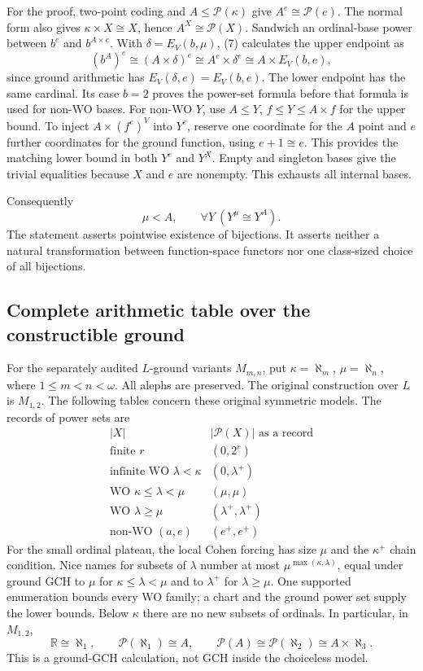 For the proof, two-point coding and $A\leq\mathcal P(\kappa)$ give
$A^e\cong\mathcal P(e)$. The normal form also gives
$\kappa\times X\cong X$, hence $A^X\cong\mathcal P(X)$.
Sandwich an ordinal-base power between $b^e$ and $b^{A\times e}$.
With $\delta=E_V(b,\mu)$, (7) calculates the upper endpoint as
\[
 (b^A)^e\cong(A\times\delta)^e
 \cong A^e\times\delta^e\cong A\times E_V(b,e),
\]
since ground arithmetic has $E_V(\delta,e)=E_V(b,e)$.
The lower endpoint has the same cardinal. Its case $b=2$ proves the
power-set formula before that formula is used for non-WO bases.
For non-WO $Y$, use $A\leq Y$, $f\leq Y\leq A\times f$ for the upper
bound. To inject $A\times(f^e)^V$ into $Y^e$, reserve one coordinate for
the $A$ point and $e$ further coordinates for the ground function,
using $e+1\cong e$. This provides the matching lower bound in both
$Y^e$ and $Y^X$. Empty and singleton bases give the trivial equalities
because $X$ and $e$ are nonempty. This exhausts all internal bases.

Consequently
\[
                  \mu<A,\qquad \forall Y\ (Y^\mu\cong Y^A).    \tag{10}
\]
The statement asserts pointwise existence of bijections. It asserts
neither a natural transformation between function-space functors nor
one class-sized choice of all bijections.

\subsection{Complete arithmetic table over the constructible ground}

For the separately audited $L$-ground variants $M_{m,n}$, put
$\kappa=\aleph_m$, $\mu=\aleph_n$, where $1\leq m<n<\omega$.
All alephs are preserved. The original construction over $L$ is $M_{1,2}$.
The following tables concern these original symmetric models.
The records of power sets are
\[
\begin{array}{c|c}
 |X|&|\mathcal P(X)|\text{ as a record}\\ \hline
 \text{finite }r&(0,2^r)\\
 \text{infinite WO }\lambda<\kappa&(0,\lambda^+)\\
 \text{WO }\kappa\leq\lambda<\mu&(\mu,\mu)\\
 \text{WO }\lambda\geq\mu&(\lambda^+,\lambda^+)\\
 \text{non-WO }(a,e)&(e^+,e^+)
\end{array}                                                       \tag{11}
\]
For the small ordinal plateau, the local Cohen forcing has size $\mu$
and the $\kappa^+$ chain condition. Nice names for subsets of $\lambda$
number at most $\mu^{\max(\kappa,\lambda)}$, equal under ground GCH to
$\mu$ for $\kappa\leq\lambda<\mu$ and to $\lambda^+$ for
$\lambda\geq\mu$. One supported enumeration bounds every WO family;
a chart and the ground power set supply the lower bounds. Below $\kappa$
there are no new subsets of ordinals. In particular, in $M_{1,2}$,
\[
 \mathbb R\cong\aleph_1,\qquad
 \mathcal P(\aleph_1)\cong A,\qquad
 \mathcal P(A)\cong\mathcal P(\aleph_2)\cong A\times\aleph_3.
\]
This is a ground-GCH calculation, not GCH inside the choiceless model.

